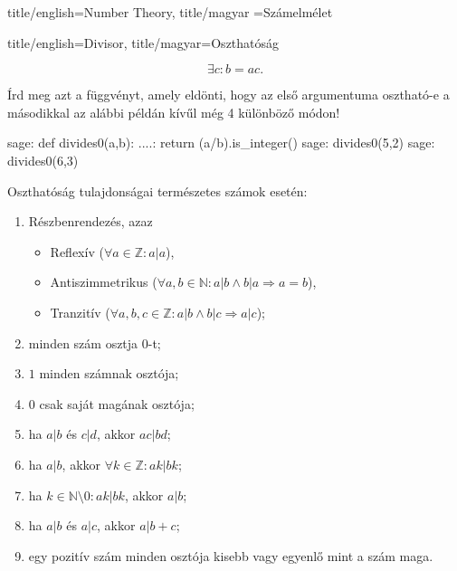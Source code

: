 \documentclass{amsbook}
\begin{document}
\begin{Part*}{
    title/english=Number Theory,
    title/magyar =Számelmélet}
\begin{Section}{
    title/english=Divisor,
    title/magyar=Oszthatóság}

  \begin{definition}[\Wrap{content/magyar=Osztó, content/english=Divisor}]
    \[ \exists c: b = ac.\]
  \end{definition}
    
  \begin{exercise}
    Írd meg azt a függvényt, amely eldönti, hogy az els\H o
    argumentuma osztható-e a másodikkal az alábbi példán kív\H ul még 4 
    különböz\H o módon!
  \end{exercise}
    
  \begin{sageexample}
    sage: def divides0(a,b):
    ....:     return (a/b).is_integer()
    sage: divides0(5,2)
    sage: divides0(6,3)
  \end{sageexample}

  
  Oszthatóság tulajdonságai természetes számok esetén:
  \begin{enumerate}
    \item Részbenrendezés, azaz
      \begin{itemize}
        \item Reflexív ($\forall a\in\mathbb{Z}: a|a$),
        \item Antiszimmetrikus 
          ($\forall a,b\in\mathbb{N}: a|b\wedge b|a\Rightarrow a=b$),
        \item Tranzitív 
          ($\forall a,b,c\in\mathbb{Z}: a|b \wedge b|c \Rightarrow a|c$);
      \end{itemize}
    \item minden szám osztja $0$-t;
    \item $1$ minden számnak osztója;
    \item $0$ csak saját magának osztója;
    \item ha $a|b$ és $c|d$, akkor $ac|bd$;
    \item ha $a|b$, akkor $\forall k\in \mathbb{Z}: ak|bk$;
    \item ha $k\in \mathbb{N}\setminus{0}:ak|bk$, akkor $a|b$;
    \item ha $a|b$ és $a|c$, akkor $a|b+c$;
    \item egy pozitív szám minden osztója kisebb vagy egyenlő mint a szám maga.
  \end{enumerate}


\end{Section}
\end{Part*}
\end{document}
